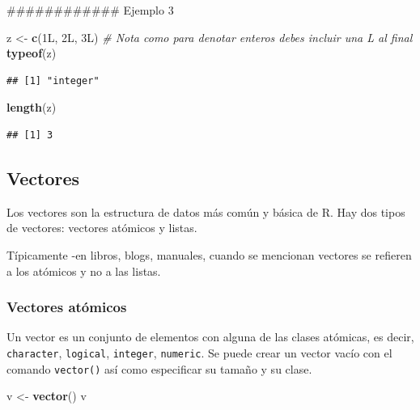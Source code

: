 \documentclass[]{article}
\newenvironment{Shaded}{\begin{snugshade}}{\end{snugshade}}
\newcommand{\KeywordTok}[1]{\textcolor[rgb]{0.13,0.29,0.53}{\textbf{{#1}}}}
\newcommand{\StringTok}[1]{\textcolor[rgb]{0.31,0.60,0.02}{{#1}}}
\newcommand{\CommentTok}[1]{\textcolor[rgb]{0.56,0.35,0.01}{\textit{{#1}}}}
\newcommand{\NormalTok}[1]{{#1}}
\begin{document}
\begin{Shaded}
\begin{Highlighting}[]
\NormalTok{############ Ejemplo 3}

\NormalTok{z <-}\StringTok{ }\KeywordTok{c}\NormalTok{(1L, 2L, 3L) }\CommentTok{# Nota como para denotar enteros debes incluir una L al final}
\KeywordTok{typeof}\NormalTok{(z)}
\end{Highlighting}
\end{Shaded}

\begin{verbatim}
## [1] "integer"
\end{verbatim}

\begin{Shaded}
\begin{Highlighting}[]
\KeywordTok{length}\NormalTok{(z)}
\end{Highlighting}
\end{Shaded}

\begin{verbatim}
## [1] 3
\end{verbatim}

\subsection{Vectores}\label{vectores}

Los vectores son la estructura de datos más común y básica de R. Hay dos
tipos de vectores: vectores atómicos y listas.

Típicamente -en libros, blogs, manuales, cuando se mencionan vectores se
refieren a los atómicos y no a las listas.

\subsubsection{Vectores atómicos}\label{vectores-atomicos}

Un vector es un conjunto de elementos con alguna de las clases atómicas,
es decir, \texttt{character}, \texttt{logical}, \texttt{integer},
\texttt{numeric}. Se puede crear un vector vacío con el comando
\texttt{vector()} así como especificar su tamaño y su clase.

\begin{Shaded}
\begin{Highlighting}[]
\NormalTok{v <-}\StringTok{ }\KeywordTok{vector}\NormalTok{()}
\NormalTok{v }
\end{Highlighting}
\end{Shaded}
\end{document}
